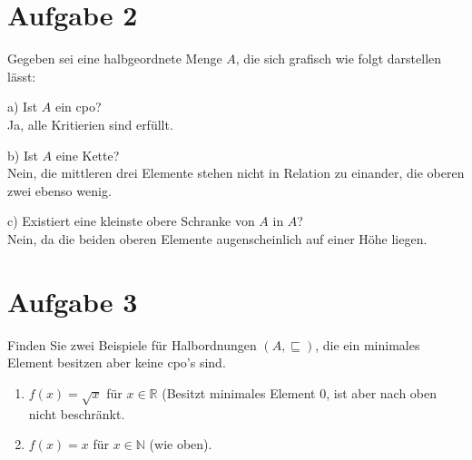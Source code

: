\documentclass[ngerman,a4paper]{report}
\begin{document}
\section*{Aufgabe 2}
Gegeben sei eine halbgeordnete Menge $A$, die sich grafisch wie folgt darstellen lässt:\\
\begin{figure}[h]
\centering
{}

\end{figure}
\begin{compactitem}
\item[a)] Ist $A$ ein cpo?\\
	Ja, alle Kritierien sind erfüllt.
\item[b)] Ist $A$ eine Kette?\\
	Nein, die mittleren drei Elemente stehen nicht in Relation zu einander, die oberen zwei ebenso wenig.
\item[c)] Existiert eine kleinste obere Schranke von $A$ in $A$?\\
	Nein, da die beiden oberen Elemente augenscheinlich auf einer Höhe liegen.
\end{compactitem}
\newpage
\section*{Aufgabe 3}
Finden Sie zwei Beispiele für Halbordnungen $(A,\sqsubseteq)$, die ein minimales Element besitzen aber keine cpo's sind.

\begin{enumerate}
	\item $f(x) = \sqrt{x}$ für $x \in \mathbb{R}$ (Besitzt minimales Element $0$, ist aber nach oben nicht beschränkt.
	\item $f(x) = x$ für $x \in \mathbb{N}$ (wie oben).
\end{enumerate}
\end{document}
